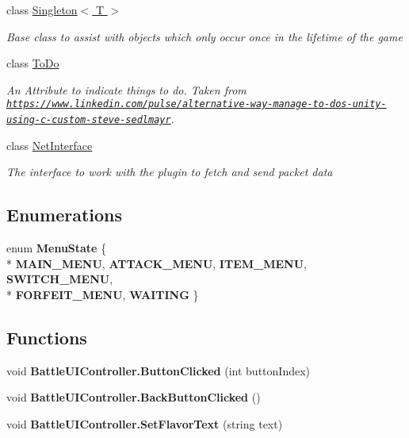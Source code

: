 \begin{DoxyCompactItemize}
class \hyperlink{class_singleton_3_01_t_01_4}{Singleton$<$ T $>$}
\begin{DoxyCompactList}\small\item\em Base class to assist with objects which only occur once in the lifetime of the game \end{DoxyCompactList}\item 
class \hyperlink{class_to_do}{To\-Do}
\begin{DoxyCompactList}\small\item\em An Attribute to indicate things to do. Taken from \href{https://www.linkedin.com/pulse/alternative-way-manage-to-dos-unity-using-c-custom-steve-sedlmayr}{\tt https\-://www.\-linkedin.\-com/pulse/alternative-\/way-\/manage-\/to-\/dos-\/unity-\/using-\/c-\/custom-\/steve-\/sedlmayr}. \end{DoxyCompactList}\item 
class \hyperlink{class_net_interface}{Net\-Interface}
\begin{DoxyCompactList}\small\item\em The interface to work with the plugin to fetch and send packet data \end{DoxyCompactList}\end{DoxyCompactItemize}
\subsection*{Enumerations}
\begin{DoxyCompactItemize}
\item 
enum {\bfseries Menu\-State} \{ \\*
{\bfseries M\-A\-I\-N\-\_\-\-M\-E\-N\-U}, 
{\bfseries A\-T\-T\-A\-C\-K\-\_\-\-M\-E\-N\-U}, 
{\bfseries I\-T\-E\-M\-\_\-\-M\-E\-N\-U}, 
{\bfseries S\-W\-I\-T\-C\-H\-\_\-\-M\-E\-N\-U}, 
\\*
{\bfseries F\-O\-R\-F\-E\-I\-T\-\_\-\-M\-E\-N\-U}, 
{\bfseries W\-A\-I\-T\-I\-N\-G}
 \}
\end{DoxyCompactItemize}
\subsection*{Functions}
\begin{DoxyCompactItemize}
\item 
\hypertarget{group__client_ga3a85307f98994f49ffcb122ad836895f}{void {\bfseries Battle\-U\-I\-Controller.\-Button\-Clicked} (int button\-Index)}\label{group__client_ga3a85307f98994f49ffcb122ad836895f}

\item 
\hypertarget{group__client_ga7cdd677370faa1526e0774b2b070e6fd}{void {\bfseries Battle\-U\-I\-Controller.\-Back\-Button\-Clicked} ()}\label{group__client_ga7cdd677370faa1526e0774b2b070e6fd}

\item 
\hypertarget{group__client_ga05427e5dab5da5027fd3f12526e7d98c}{void {\bfseries Battle\-U\-I\-Controller.\-Set\-Flavor\-Text} (string text)}\label{group__client_ga05427e5dab5da5027fd3f12526e7d98c}

\end{DoxyCompactItemize}
